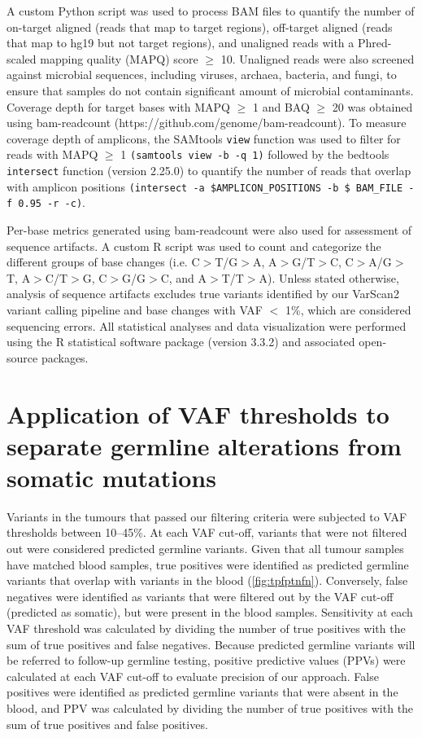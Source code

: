 A custom Python script was used to process BAM files to quantify the number of on-target aligned (reads that map to target regions), off-target aligned (reads that map to hg19 but not target regions), and unaligned reads with a Phred-scaled mapping quality (MAPQ) score $\geq$ 10. Unaligned reads were also screened against microbial sequences, including viruses, archaea, bacteria, and fungi, to ensure that samples do not contain significant amount of microbial contaminants. Coverage depth for target bases with MAPQ $\geq$ 1 and BAQ $\geq$ 20 was obtained using bam-readcount (https://github.com/genome/bam-readcount). To measure coverage depth of amplicons, the SAMtools \texttt{view} function was used to filter for reads with MAPQ $\geq$ 1 \texttt{(samtools view -b -q 1)} followed by the bedtools \texttt{intersect} function (version 2.25.0) to quantify the number of reads that overlap with amplicon positions \texttt{(intersect -a \$AMPLICON\_POSITIONS -b \$ BAM\_FILE -f 0.95 -r -c)}.

Per-base metrics generated using bam-readcount were also used for assessment of sequence artifacts. A custom R script was used to count and categorize the different groups of base changes (i.e. C$>$T/G$>$A, A$>$G/T$>$C, C$>$A/G$>$T, A$>$C/T$>$G, C$>$G/G$>$C, and A$>$T/T$>$A). Unless stated otherwise, analysis of sequence artifacts excludes true variants identified by our VarScan2 variant calling pipeline and base changes with VAF $<$ 1\%, which are considered sequencing errors. All statistical analyses and data visualization were performed using the R statistical software package (version 3.3.2) and associated open-source packages.

\section{Application of VAF thresholds to separate germline alterations from somatic mutations}
\label{sec:ApplicationofVAFthresholdstoseparategermlinealterationsfromsomaticmutations}

Variants in the tumours that passed our filtering criteria were subjected to VAF thresholds between 10--45\%. At each VAF cut-off, variants that were not filtered out were considered predicted germline variants. Given that all tumour samples have matched blood samples, true positives were identified as predicted germline variants that overlap with variants in the blood (\autoref{fig:tpfptnfn}). Conversely, false negatives were identified as variants that were filtered out by the VAF cut-off (predicted as somatic), but were present in the blood samples. Sensitivity at each VAF threshold was calculated by dividing the number of true positives with the sum of true positives and false negatives. Because predicted germline variants will be referred to follow-up germline testing, positive predictive values (PPVs) were calculated at each VAF cut-off to evaluate precision of our approach. False positives were identified as predicted germline variants that were absent in the blood, and PPV was calculated by dividing the number of true positives with the sum of true positives and false positives. 

